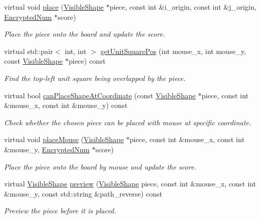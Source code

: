 \begin{DoxyCompactItemize}
virtual void \mbox{\hyperlink{class_board_a759fee79a5c0da27101adc909c352b62}{place}} (\mbox{\hyperlink{class_visible_shape}{Visible\+Shape}} $\ast$piece, const int \&i\+\_\+origin, const int \&j\+\_\+origin, \mbox{\hyperlink{class_encrypted_num}{Encrypted\+Num}} $\ast$score)
\begin{DoxyCompactList}\small\item\em Place the piece onto the board and update the score. \end{DoxyCompactList}\item 
virtual std\+::pair$<$ int, int $>$ \mbox{\hyperlink{class_board_a47fb67404ee45b4ad700a57e3849995b}{get\+Unit\+Square\+Pos}} (int mouse\+\_\+x, int mouse\+\_\+y, const \mbox{\hyperlink{class_visible_shape}{Visible\+Shape}} $\ast$piece) const
\begin{DoxyCompactList}\small\item\em Find the top-\/left unit square being overlapped by the piece. \end{DoxyCompactList}\item 
virtual bool \mbox{\hyperlink{class_board_aa4001c8b1e2338fa0dfed7df6f5dcb6b}{can\+Place\+Shape\+At\+Coordinate}} (const \mbox{\hyperlink{class_visible_shape}{Visible\+Shape}} $\ast$piece, const int \&mouse\+\_\+x, const int \&mouse\+\_\+y) const
\begin{DoxyCompactList}\small\item\em Check whether the chosen piece can be placed with mouse at specific coordinate. \end{DoxyCompactList}\item 
virtual void \mbox{\hyperlink{class_board_a6403c0a5182a07188fd0011748f27e9c}{place\+Mouse}} (\mbox{\hyperlink{class_visible_shape}{Visible\+Shape}} $\ast$piece, const int \&mouse\+\_\+x, const int \&mouse\+\_\+y, \mbox{\hyperlink{class_encrypted_num}{Encrypted\+Num}} $\ast$score)
\begin{DoxyCompactList}\small\item\em Place the piece onto the board by mouse and update the score. \end{DoxyCompactList}\item 
virtual \mbox{\hyperlink{class_visible_shape}{Visible\+Shape}} \mbox{\hyperlink{class_board_a51f08756175c14dd36acfcdf3b9ea356}{preview}} (\mbox{\hyperlink{class_visible_shape}{Visible\+Shape}} piece, const int \&mouse\+\_\+x, const int \&mouse\+\_\+y, const std\+::string \&path\+\_\+reverse) const
\begin{DoxyCompactList}\small\item\em Preview the piece before it is placed. \end{DoxyCompactList}\item 

\end{DoxyCompactItemize}
